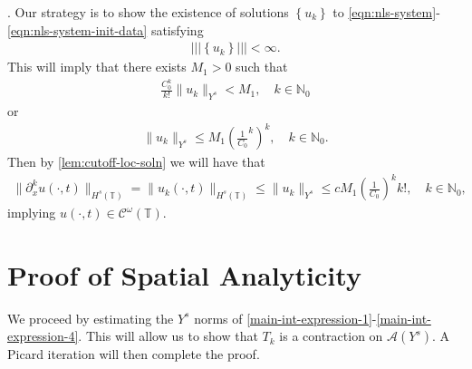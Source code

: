 \documentclass[12pt,reqno]{amsart}
\numberwithin{equation}{section}  %
\numberwithin{figure}{section}
\newcommand{\ci}{\mathbb{T}}
\newcommand{\p}{\partial}
\theoremstyle{plain}
\theoremstyle{definition}
\theoremstyle{remark}
\begin{document}
\cite{Kato:2000vn}. Our strategy is to show the existence of solutions $\left\{
u_k \right\}$ to \eqref{eqn:nls-system}-\eqref{eqn:nls-system-init-data}
satisfying
%
%
\begin{equation*}
\begin{split}
  | | |\left\{ u_k \right\} | | | < \infty.
\end{split}
\end{equation*}
%
%
This will imply that there exists $M_1 >0$ such that
%
%
\begin{equation*}
\begin{split}
  \frac{C_0^k}{k!} \|u_k\|_{Y^s} < M_1, \quad k \in \mathbb{N}_0
\end{split}
\end{equation*}
%
%
or
%
%
\begin{equation*}
\begin{split}
  \|u_k\|_{Y^s} \le M_1 \left( \frac{1}{C_0}^k  \right)^k, \quad k \in
  \mathbb{N}_0.
\end{split}
\end{equation*}
%
%
Then by \autoref{lem:cutoff-loc-soln} we will have that
%
%
\begin{equation*}
\begin{split}
  \|\p_x^k u(\cdot, t) \|_{H^s(\ci)} = \|u_k(\cdot, t) \|_{H^s(\ci)} \le \|u_k
  \|_{Y^s} \le c M_1 \left( \frac{1}{C_0} \right)^k k!, \quad k \in
  \mathbb{N}_0,
\end{split}
\end{equation*}
%
%
implying $u(\cdot, t) \in \mathcal{C}^\omega (\ci)$. 
%
%
%
%
%
%
%
%
%
\section{Proof of Spatial Analyticity} 
\label{sec:proof-spat-anal}
We proceed by estimating the $Y^s$ norms of
\eqref{main-int-expression-1}-\eqref{main-int-expression-4}. This will allow us
to show that $T_k$ is a contraction on $\mathcal{A}(Y^s)$. A Picard iteration
will then complete the proof. 
%
%
\end{document}
